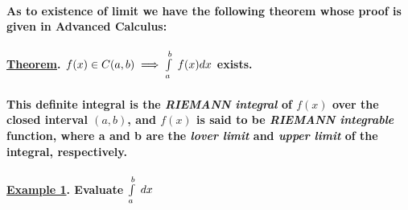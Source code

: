 \documentclass[11pt]{amsbook}
\begin{document}
\paragraph{As to existence of limit we have the following theorem whose proof is given in Advanced Calculus:}


\paragraph{\underline{Theorem}. $f(x) \in C(a,b) \implies \int\limits_a^b \hspace{.1cm} f(x)dx$ exists.}


\paragraph{This definite integral is the \emph{RIEMANN integral} of $f(x)$ over the closed interval $(a, b)$, and $f(x)$ is said to be \emph{RIEMANN integrable} function, where a and b are the \emph{lover limit} and \emph{upper limit} of the integral, respectively.}

\paragraph{\underline{Example 1}. Evaluate \hspace{.2cm}$\int\limits_a^b \hspace{.1cm} dx$}
\end{document}
